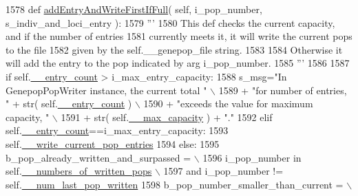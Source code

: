 \begin{DoxyCode}
1578     \textcolor{keyword}{def }\hyperlink{classnegui_1_1pgutilityclasses_1_1GenepopPopWriter_a5c7d53c68d1c3533ed1fd861f9bd60e4}{addEntryAndWriteFirstIfFull}( self, i\_pop\_number, s\_indiv\_and\_loci\_entry 
      ):
1579         \textcolor{stringliteral}{'''}
1580 \textcolor{stringliteral}{        This def checks the current capacity, and if the number of entries }
1581 \textcolor{stringliteral}{        currently meets it, it will write the current pops to the file}
1582 \textcolor{stringliteral}{        given by the self.\_\_genepop\_file string.}
1583 \textcolor{stringliteral}{}
1584 \textcolor{stringliteral}{        Otherwise it will add the entry to the pop indicated by arg i\_pop\_number.}
1585 \textcolor{stringliteral}{        '''}
1586 
1587         \textcolor{keywordflow}{if} self.\hyperlink{classnegui_1_1pgutilityclasses_1_1GenepopPopWriter_a304e157063ad06904e141c994c5b514f}{\_\_entry\_count} > i\_max\_entry\_capacity:
1588             s\_msg=\textcolor{stringliteral}{"In GenepopPopWriter instance, the current total "} \(\backslash\)
1589                         + \textcolor{stringliteral}{"for number of entries, "} + str( self.\hyperlink{classnegui_1_1pgutilityclasses_1_1GenepopPopWriter_a304e157063ad06904e141c994c5b514f}{\_\_entry\_count} ) \(\backslash\)
1590                         + \textcolor{stringliteral}{"exceeds the value for maximum capacity, "} \(\backslash\)
1591                         + str( self.\hyperlink{classnegui_1_1pgutilityclasses_1_1GenepopPopWriter_ac04999010b2eda1fbfc0c36cdac4943c}{\_\_max\_capacity} ) + \textcolor{stringliteral}{"."}
1592         \textcolor{keywordflow}{elif} self.\hyperlink{classnegui_1_1pgutilityclasses_1_1GenepopPopWriter_a304e157063ad06904e141c994c5b514f}{\_\_entry\_count}==i\_max\_entry\_capacity:
1593             self.\hyperlink{classnegui_1_1pgutilityclasses_1_1GenepopPopWriter_a5cc6479ab88e930a41d03b589397d241}{\_\_write\_current\_pop\_entries}
1594         \textcolor{keywordflow}{else}:
1595             b\_pop\_already\_written\_and\_surpassed = \(\backslash\)
1596                 i\_pop\_number \textcolor{keywordflow}{in} self.\hyperlink{classnegui_1_1pgutilityclasses_1_1GenepopPopWriter_a9ee4e3161f6698084fcf0d2ab747bd80}{\_\_numbers\_of\_written\_pops} \(\backslash\)
1597                     \textcolor{keywordflow}{and} i\_pop\_number != self.\hyperlink{classnegui_1_1pgutilityclasses_1_1GenepopPopWriter_ae11fb07e14cea411fd205f014cd75474}{\_\_num\_last\_pop\_written}
1598             b\_pop\_number\_smaller\_than\_current = \(\backslash\)

\end{DoxyCode}
